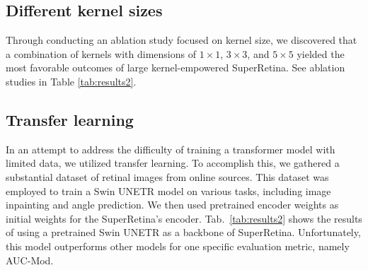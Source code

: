 \documentclass[10pt,twocolumn,letterpaper]{article}
\begin{document}
\begin{table*}
\begin{tabular}{@{}lc@{}}
\bottomrule
  \end{tabular}
  \caption{ A comparison among various techniques for retinal image matching, specifically focusing on the results obtained when testing the methods on the FIRE dataset~\cite{hernandez2017fire}. Our proposed method demonstrates superior performance when compared to both traditional and deep learning approaches. Ours-1 refers to large-kernel-empowered SuperRetina, while Ours-2 refers to Swin UNETR-empowered SuperRetina with SuperRetina as a teacher and drop out 50\%. In the table we provide the percentage values [\%] of failed, inaccurate, and acceptable.}
  \label{tab:results1}
\end{table*}

\subsection{Different kernel sizes}
Through conducting an ablation study focused on kernel size, we discovered that a combination of kernels with dimensions of $1 \times 1$, $3 \times 3$, and $5 \times 5$ yielded the most favorable outcomes of large kernel-empowered SuperRetina. See ablation studies in Table \ref{tab:results2}.

\subsection{Transfer learning}
In an attempt to address the difficulty of training a transformer model with limited data, we utilized transfer learning. To accomplish this, we gathered a substantial dataset of retinal images from online sources. This dataset was employed to train a Swin UNETR model on various tasks, including image inpainting and angle prediction. We then used pretrained encoder weights as initial weights for the SuperRetina's encoder. Tab.~\ref{tab:results2} shows the results of using a pretrained Swin UNETR as a backbone of SuperRetina. Unfortunately, this model outperforms other models for one specific evaluation metric, namely AUC-Mod.
\end{document}
